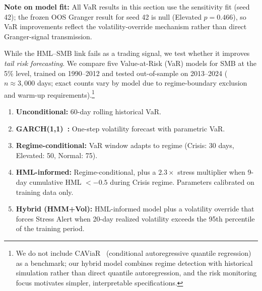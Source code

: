 \documentclass[sigconf,anonymous]{acmart}
\begin{document}
\textbf{Note on model fit:} All VaR results in this section use the sensitivity
fit (seed 42); the frozen OOS Granger result for seed 42 is null
(Elevated $p = 0.466$), so VaR improvements reflect the volatility-override
mechanism rather than direct Granger-signal transmission.

While the HML--SMB link fails as a trading signal, we test whether it improves
\emph{tail risk forecasting}. We compare five Value-at-Risk (VaR) models for SMB
at the 5\% level, trained on 1990--2012 and tested out-of-sample on 2013--2024
($n \approx 3{,}000$ days; exact counts vary by model due to regime-boundary
exclusion and warm-up requirements).\footnote{We do not include
CAViaR~\cite{engle2004caviar} (conditional autoregressive quantile regression) as a
benchmark; our hybrid model combines regime detection with historical simulation rather
than direct quantile autoregression, and the risk monitoring focus motivates simpler,
interpretable specifications.}

\begin{enumerate}
    \item \textbf{Unconditional:} 60-day rolling historical VaR.
    \item \textbf{GARCH(1,1)~\cite{bollerslev1986generalized}:} One-step volatility forecast with parametric VaR.
    \item \textbf{Regime-conditional:} VaR window adapts to regime
    (Crisis: 30 days, Elevated: 50, Normal: 75).
    \item \textbf{HML-informed:} Regime-conditional, plus a $2.3\times$ stress
    multiplier when 9-day cumulative HML $< -0.5$ during Crisis regime.
    Parameters calibrated on training data only.
    \item \textbf{Hybrid (HMM+Vol):} HML-informed model plus a volatility
    override that forces Stress Alert when 20-day realized volatility exceeds
    the 95th percentile of the training period.
\end{enumerate}
\end{document}
